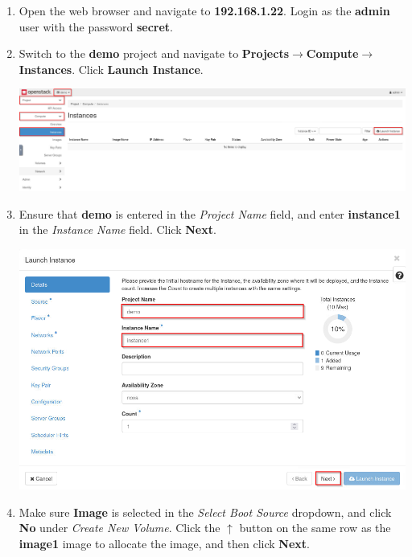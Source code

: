 \documentclass[letterpaper, 12pt]{article}
\begin{document}
\begin{enumerate}
    \item Open the web browser and navigate to \textbf{192.168.1.22}. Login as the \textbf{admin} user with the password
    \textbf{secret}.

    \item Switch to the \textbf{demo} project and navigate to
    \textbf{Projects$\rightarrow$Compute$\rightarrow$Instances}. Click \textbf{Launch Instance}.

    \begin{center}
        \includegraphics[width=\linewidth]{images/part4/step2.png}
    \end{center}

    \item Ensure that \textbf{demo} is entered in the \textit{Project Name} field, and enter \textbf{instance1} in the
    \textit{Instance Name} field. Click \textbf{Next}.
    
    \begin{center}
        \includegraphics[width=\linewidth]{images/part4/step3.png}
    \end{center}

    \item Make sure \textbf{Image} is selected in the \textit{Select Boot Source} dropdown, and click \textbf{No} under
    \textit{Create New Volume}. Click the $\uparrow$ button on the same row as the \textbf{image1} image to allocate the
    image, and then click \textbf{Next}.


\end{enumerate}
\end{document}
